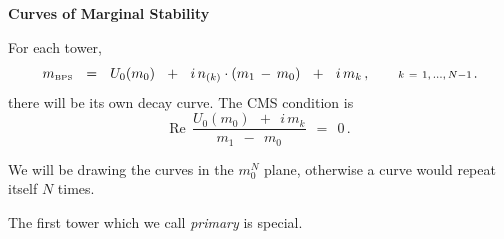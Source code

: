 \documentclass[12pt,letterpaper,landscape,KOMA,smallheadings,calcdimensions,display]{powersem}
\newcommand{\mbps}{m_{\text{\tiny BPS}}}
\begin{document}
\begin{slide}

\vspace*{3.0cm} 
\begin{center}
\fontsize{35pt}{30pt}\selectfont
\bfseries
	Curves of Marginal Stability
\end{center}
\vspace*{2.0cm} 

\end{slide}


\begin{slide}
\vspace*{2cm}

	For each tower,
\[
	\mbps ~~=~~ U_0 (m_0) ~~+~~ i\, n_{(k)} \cdot ( m_1 \,-\, m_0 ) ~~+~~ i\, m_k\,,
	\qquad {\scriptstyle k ~=~ 1,\,...,\, N-1\,}.
\]
	there will be its own decay curve.
	The CMS condition is 
\[
	\text{Re}~~ \frac{ U_0 (m_0) ~~+~~ i\, m_k }
                         { m_1 ~~-~~ m_0 }    ~~=~~ 0\,. 
\]

	We will be drawing the curves in the $ m_0^N $ plane, otherwise a curve would
	repeat itself $ N $ times.

\end{slide}


\begin{slide}

	The first tower which we call \emph{primary} is special. 


\end{slide}
\end{document}
